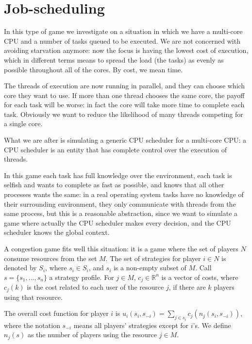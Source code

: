 \section{Job-scheduling}

In this type of game we investigate on a situation in which we have a
multi-core CPU and a number of tasks queued to be executed. We are not
concerned with avoiding starvation anymore: now the focus is having the
lowest cost of execution, which in different terms means to spread the
load (the tasks) as evenly as possible throughout all of the cores. By
cost, we mean time.

The threads of execution are now running in parallel, and they can
choose which core they want to use. If more than one thread chooses the
same core, the payoff for each task will be worse: in fact the core will
take more time to complete each task. Obviously we want to reduce the
likelihood of many threads competing for a single core.

What we are after is simulating a generic CPU scheduler for a multi-core
CPU: a CPU scheduler is an entity that has complete control over the
execution of threads.

In this game each task has full knowledge over the environment, each
task is selfish and wants to complete as fast as possible, and knows
that all other processes wants the same: in a real operating system
tasks have no knowledge of their surrounding environment, they only
communicate with threads from the same process, but this is a reasonable
abstraction, since we want to simulate a game where actually the CPU
scheduler makes every decision, and the CPU scheduler knows the global
context.

A congestion game fits well this
situation: it is a game where the set of players \(N\) consume resources
from the set \(M\). The set of strategies for player \(i\in N\) is
denoted by \(S_i\), where \(s_i \in S_i\), and \(s_i\) is a non-empty
subset of \(M\). Call \(s = \{s_1,...,s_n\}\) a strategy profile. For
\(j\in M\), \(c_j\in \mathbb{R}^n\) is a vector of costs, where
\(c_j(k)\) is the cost related to each user of the resource \(j\), if
there are \(k\) players using that resource.

The overall cost function for player \(i\) is
\(u_i(s_i, s_{-i})=\sum_{j\in s_i} c_j(n_j(s_i, s_{-i}))\), where the
notation \(s_{-i}\) means all players' strategies except for \(i\)'s. We
define \(n_j(s)\) as the number of players using the resource
\(j\in M\).


